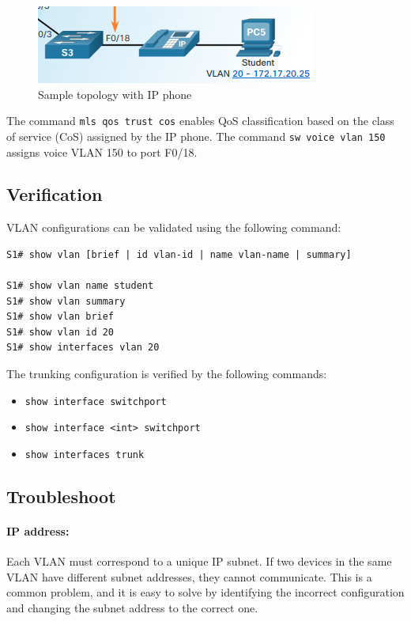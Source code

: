 \begin{figure}[hbtp]
\caption{Sample topology with IP phone}\label{VoiceVLAN}
\centering
\includegraphics[scale=0.6]{pictures/VoiceVLAN.PNG}
\end{figure}

The command \verb|mls qos trust cos| enables QoS classification based on the class of service (CoS) assigned by the IP phone. The command \verb|sw voice vlan 150| assigns  voice VLAN 150 to port F0/18. 

\subsection{Verification}

VLAN configurations can be validated using the following command:

\begin{verbatim}
S1# show vlan [brief | id vlan-id | name vlan-name | summary]

S1# show vlan name student
S1# show vlan summary
S1# show vlan brief
S1# show vlan id 20
S1# show interfaces vlan 20
\end{verbatim}

The trunking configuration is verified by the following commands:

\begin{itemize}
\item \verb|show interface switchport|
\item \verb|show interface <int> switchport|
\item \verb|show interfaces trunk| 
\end{itemize}

\subsection{Troubleshoot}

\paragraph{IP address:} Each VLAN must correspond to a unique IP subnet. If two devices in the same VLAN have different subnet addresses, they cannot communicate. This is a common problem, and it is easy to solve by identifying the incorrect configuration and changing the subnet address to the correct one.

